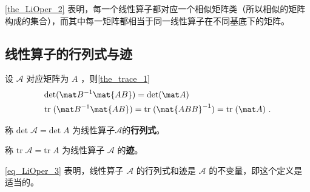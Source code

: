 \autoref{the_LiOper_2} 表明，每一个线性算子都对应一个相似矩阵类（所以相似的矩阵构成的集合），而其中每一矩阵都相当于同一线性算子在不同基底下的矩阵。
\subsection{线性算子的行列式与迹}\label{sub_LiOper_2}
设 $\mathcal{A}$ 对应矩阵为 $A$ ，则\autoref{the_trace_1}~ 
\begin{equation}\label{eq_LiOper_3}
\begin{aligned}
&\mathrm{det}(\mat B^{-1}\mat{AB})=\mathrm{det}(\mat A)\\
&\mathrm{tr}\;(\mat B^{-1}\mat{AB})=\mathrm{tr}\;(\mat{ABB}^{-1})=\mathrm{tr}\;(\mat A)~.
\end{aligned}
\end{equation}
\begin{definition}{}
称
$
\mathrm{det}\;\mathcal{A}=\mathrm{det}\;A
$
为线性算子$\mathcal{A}$的\textbf{行列式}。

称
$
\mathrm{tr}\;\mathcal{A}=\mathrm{tr}\;A
$
为线性算子 $\mathcal{A}$ 的\textbf{迹}。
\end{definition}
\autoref{eq_LiOper_3} 表明，线性算子 $\mathcal{A}$ 的行列式和迹是 $\mathcal{A}$ 的不变量，即这个定义是适当的。
